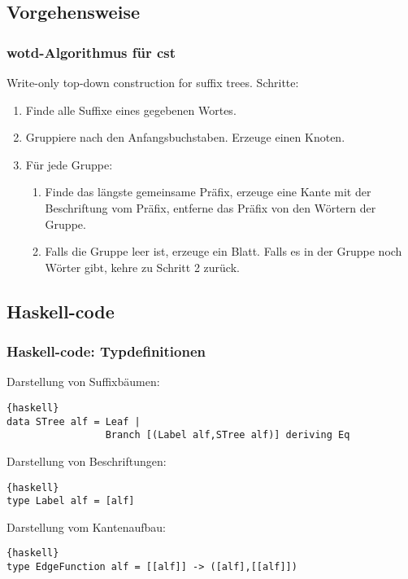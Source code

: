 \documentclass{beamer}
\begin{document}
\subsection{Vorgehensweise}

\begin{frame}[t]
\frametitle{wotd-Algorithmus für cst}
    Write-only top-down construction for suffix trees.
    \medskip
    Schritte:
    \begin{enumerate}
    \item Finde alle Suffixe eines gegebenen Wortes.
    \item Gruppiere nach den Anfangsbuchstaben. Erzeuge einen Knoten.
    \item Für jede Gruppe:
    \begin{enumerate}
    \item Finde das längste gemeinsame Präfix, erzeuge eine Kante mit der Beschriftung vom Präfix, entferne das Präfix von den Wörtern der Gruppe.
    \item Falls die Gruppe leer ist, erzeuge ein Blatt. Falls es in der Gruppe noch Wörter gibt, kehre zu Schritt 2 zurück.
    \end{enumerate}
    \end{enumerate}
\end{frame}


\subsection{Haskell-code}

\begin{frame}[fragile]
\frametitle{Haskell-code: Typdefinitionen}
Darstellung von Suffixbäumen:
\begin{lstlisting}{haskell}
data STree alf = Leaf | 
                 Branch [(Label alf,STree alf)] deriving Eq
\end{lstlisting}
\bigskip
Darstellung von Beschriftungen:
\begin{lstlisting}{haskell}
type Label alf = [alf]
\end{lstlisting}
\bigskip
Darstellung vom Kantenaufbau:
\begin{lstlisting}{haskell}
type EdgeFunction alf = [[alf]] -> ([alf],[[alf]])
\end{lstlisting}
\end{frame}
\end{document}
